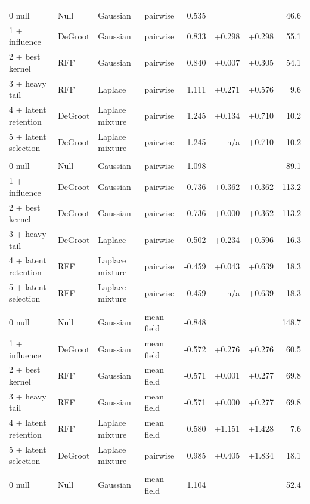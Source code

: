 \begin{longtable}{llllrrrr}
\midrule
\multicolumn{8}{l}{\adamsHi{}} \\
0 null & Null & Gaussian & pairwise & 0.535 &  &  & 46.6 \\
1 + influence & DeGroot & Gaussian & pairwise & 0.833 & +0.298 & +0.298 & 55.1 \\
2 + best kernel & RFF & Gaussian & pairwise & 0.840 & +0.007 & +0.305 & 54.1 \\
3 + heavy tail & RFF & Laplace & pairwise & 1.111 & +0.271 & +0.576 & 9.6 \\
4 + latent retention & DeGroot & Laplace mixture & pairwise & 1.245 & +0.134 & +0.710 & 10.2 \\
5 + latent selection & DeGroot & Laplace mixture & pairwise & 1.245 & n/a & +0.710 & 10.2 \\
\midrule
\multicolumn{8}{l}{\becker{}} \\
0 null & Null & Gaussian & pairwise & -1.098 &  &  & 89.1 \\
1 + influence & DeGroot & Gaussian & pairwise & -0.736 & +0.362 & +0.362 & 113.2 \\
2 + best kernel & DeGroot & Gaussian & pairwise & -0.736 & +0.000 & +0.362 & 113.2 \\
3 + heavy tail & DeGroot & Laplace & pairwise & -0.502 & +0.234 & +0.596 & 16.3 \\
4 + latent retention & RFF & Laplace mixture & pairwise & -0.459 & +0.043 & +0.639 & 18.3 \\
5 + latent selection & RFF & Laplace mixture & pairwise & -0.459 & n/a & +0.639 & 18.3 \\
\midrule
\multicolumn{8}{l}{\cmv{}} \\
0 null & Null & Gaussian & mean field & -0.848 &  &  & 148.7 \\
1 + influence & DeGroot & Gaussian & mean field & -0.572 & +0.276 & +0.276 & 60.5 \\
2 + best kernel & RFF & Gaussian & mean field & -0.571 & +0.001 & +0.277 & 69.8 \\
3 + heavy tail & RFF & Gaussian & mean field & -0.571 & +0.000 & +0.277 & 69.8 \\
4 + latent retention & RFF & Laplace mixture & mean field & 0.580 & +1.151 & +1.428 & 7.6 \\
5 + latent selection & DeGroot & Laplace mixture & pairwise & 0.985 & +0.405 & +1.834 & 18.1 \\
\midrule
\multicolumn{8}{l}{\house{}} \\
0 null & Null & Gaussian & mean field & 1.104 &  &  & 52.4 \\

\end{longtable}
